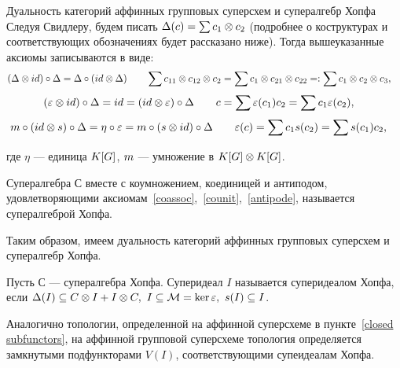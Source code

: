 \begin{subsection}{Дуальность категорий аффинных групповых суперсхем и супералгебр Хопфа}
  Следуя Свидлеру, будем писать $ \Delta(c) = \sum c_1 \otimes c_2 $ 
  (подробнее о коструктурах и соответствующих обозначениях будет рассказано ниже).
  Тогда вышеуказанные аксиомы записываются в виде:
  \begin{align*}
    (\Delta \otimes id) \circ \Delta = \Delta \circ (id \otimes \Delta) & \qquad
    \sum c_{11} \otimes c_{12} \otimes c_2 = \sum c_1 \otimes c_{21} \otimes c_{22} =: \sum c_1 \otimes c_2 \otimes c_3,
  \end{align*}
  \begin{align*}
    (\varepsilon \otimes id) \circ \Delta = id = (id \otimes \varepsilon) \circ \Delta & \qquad
    c = \sum \varepsilon(c_1) c_2 = \sum c_1 \varepsilon(c_2),
  \end{align*}
  \begin{align*}
    m \circ (id \otimes s) \circ \Delta = \eta \circ \varepsilon = m \circ (s \otimes id) \circ \Delta & \qquad
    \varepsilon (c) = \sum c_1 s(c_2) = \sum s(c_1) c_2,
  \end{align*}

  где $ \eta $ --- единица $ K[G] $, $ m $ --- умножение в $ K[G] \otimes K[G] $.

  \begin{definition}
    Супералгебра $ С $ вместе с коумножением, коединицей и антиподом,
    удовлетворяющими аксиомам~\ref{coassoc},~\ref{counit},~\ref{antipode},
    называется супералгеброй Хопфа.
  \end{definition}

  Таким образом, имеем дуальность категорий аффинных групповых суперсхем
  и супералгебр Хопфа.

  \begin{definition}
    Пусть $ С $ --- супералгебра Хопфа. Суперидеал $ I $ называется суперидеалом Хопфа,
    если $ \Delta (I) \subseteq C \otimes I + I \otimes C, ~I \subseteq \mathcal{M} = \ker\varepsilon, ~s(I) \subseteq I $.
  \end{definition}

  Аналогично топологии, определенной на аффинной суперсхеме
  в пункте~\ref{closed subfunctors}, на аффинной групповой суперсхеме
  топология определяется замкнутыми подфункторами $ V(I) $, соответствующими
  супеидеалам Хопфа.
  
\end{subsection}

